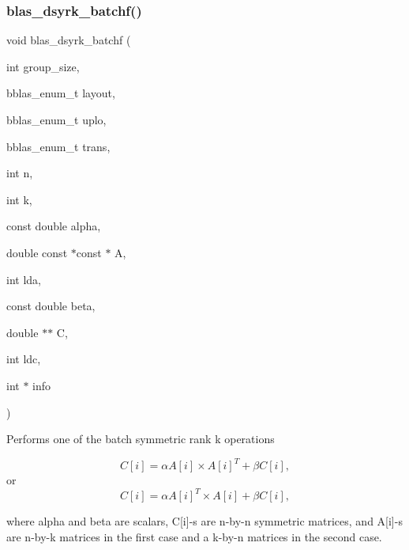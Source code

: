 \subsubsection{\texorpdfstring{blas\+\_\+dsyrk\+\_\+batchf()}{blas\_dsyrk\_batchf()}}
{\footnotesize\ttfamily void blas\+\_\+dsyrk\+\_\+batchf (\begin{DoxyParamCaption}\item[{int}]{group\+\_\+size,  }\item[{bblas\+\_\+enum\+\_\+t}]{layout,  }\item[{bblas\+\_\+enum\+\_\+t}]{uplo,  }\item[{bblas\+\_\+enum\+\_\+t}]{trans,  }\item[{int}]{n,  }\item[{int}]{k,  }\item[{const double}]{alpha,  }\item[{double const $\ast$const $\ast$}]{A,  }\item[{int}]{lda,  }\item[{const double}]{beta,  }\item[{double $\ast$$\ast$}]{C,  }\item[{int}]{ldc,  }\item[{int $\ast$}]{info }\end{DoxyParamCaption})}

Performs one of the batch symmetric rank k operations

\[ C[i] = \alpha A[i] \times A[i]^T + \beta C[i], \] or \[ C[i] = \alpha A[i]^T \times A[i] + \beta C[i], \]

where alpha and beta are scalars, C\mbox{[}i\mbox{]}-\/s are n-\/by-\/n symmetric matrices, and A\mbox{[}i\mbox{]}-\/s are n-\/by-\/k matrices in the first case and a k-\/by-\/n matrices in the second case.


